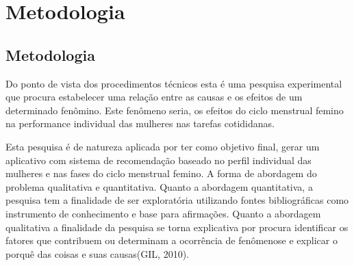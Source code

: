 \chapter[Metodologia]{Metodologia}

\section{Metodologia}
          
Do ponto de vista dos procedimentos técnicos esta é uma pesquisa experimental que procura estabelecer uma relação entre as causas e os efeitos de um determinado fenômino. Este fenômeno seria, os efeitos do ciclo menstrual femino na performance individual das mulheres nas tarefas cotididanas.

Esta pesquisa é de natureza aplicada por ter como objetivo final, gerar um aplicativo com sistema de recomendação baseado no perfil individual das mulheres e nas fases do ciclo menstrual femino. A forma de abordagem do problema qualitativa e quantitativa. Quanto a abordagem quantitativa, a pesquisa tem a finalidade de ser exploratória utilizando fontes bibliográficas como instrumento de conhecimento e base para afirmações. Quanto a abordagem qualitativa a finalidade da pesquisa se torna explicativa por procura identificar os fatores que contribuem ou determinam a ocorrência de fenômenose e explicar o porquê das coisas e suas causas(GIL, 2010).

